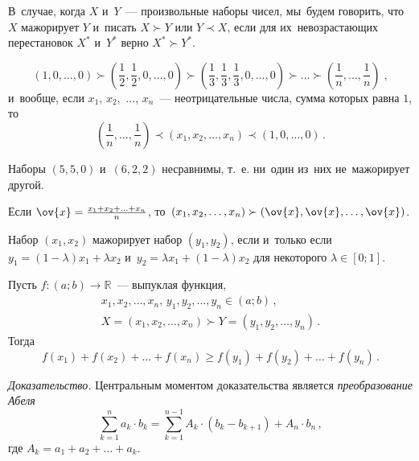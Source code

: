 В~случае, когда $X$ и~$Y$~--- произвольные наборы чисел,  мы~будем говорить,
что $X$ мажорирует $Y$ и~писать $X\succ Y$ или $Y\prec X$, если для
их~невозрастающих перестановок $X^*$ и~$Y^*$ верно $X^*\succ Y^*$.

\[
    \left( 1, 0, \ldots, 0 \right)
\succ
    \left( \frac{1}{2}, \frac{1}{2}, 0, \ldots,0 \right)
\succ
    \left( \frac{1}{3}, \frac{1}{3}, \frac{1}{3}, 0, \ldots, 0 \right)
\succ\ldots\succ
    \left( \frac{1}{n}, \ldots, \frac{1}{n} \right)
\;,\]
и~вообще, если $x_1$, $x_2$,~$\dots$, $x_n$~--- неотрицательные числа, сумма
которых равна $1$, то%
\[
    \left( \frac{1}{n}, \ldots, \frac{1}{n} \right)
\prec
    \left( x_1, x_2, \ldots, x_n \right)
\prec
    \left( 1, 0, \ldots, 0 \right)
\,.\]

Наборы $(5, 5, 0)$ и~$(6, 2, 2)$ несравнимы, т.~е. ни~один из~них
не~мажорирует другой.

Если $\ov{x} = \frac{x_1 + x_2 + \ldots + x_n}{n}$,
то~$(x_1, x_2, \ldots, x_n) \succ (\ov{x}, \ov{x}, \ldots, \ov{x})$.

Набор $(x_1, x_2)$ мажорирует набор $(y_1, y_2)$, если и~только если
$y_1 = (1 - \lambda) x_1 + \lambda x_2$
и~$y_2 = \lambda x_1 + (1 - \lambda) x_2$
для некоторого $\lambda \in [0; 1]$.

\hrulefill

Пусть $f \colon (a; b) \to \mathbb{R}$~--- выпуклая функция,
\begin{gather*}
    x_1, x_2, \ldots, x_n, \, y_1, y_2, \ldots, y_n \in (a; b)
\,,\\
    X = (x_1, x_2, \ldots, x_n) \succ Y = (y_1, y_2, \ldots, y_n)
\,.\end{gather*}
Тогда
\[
    f(x_1) + f(x_2) + \ldots + f(x_n)
\geq
    f(y_1) + f(y_2) + \ldots + f(y_n)
\,.\]

\textit{Доказательство.}
Центральным моментом доказательства является \emph{преобразование Абеля}
\[
    \sum\limits_{k=1}^n
        a_k \cdot b_k
=
    \sum\limits_{k=1}^{n-1}
        A_k \cdot (b_k - b_{k+1}) + A_n \cdot b_n
\,,\]
где $A_k = a_1 + a_2 + \ldots + a_k$.

